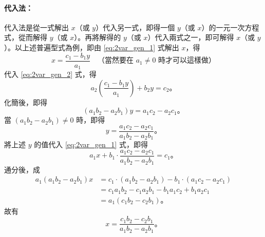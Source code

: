 \paragraph{代入法：}
代入法是從一式解出 $x$（或 $y$）代入另一式，即得一個 $y$（或 $x$）的一元一次方程式，從而解得 $y$（或 $x$）。再將解得的 $y$（或 $x$）代入兩式之一，即可解得 $x$（或 $y$）。以上述普遍型式為例，即由 \eqref{eq:2var_gen_1} 式解出 $x$，得
\begin{equation*}
  x = \frac{c_1 - b_1 y}{a_1} \quad \text{（當然要在 $a_1 \neq 0$ 時才可以這樣做）}
\end{equation*}
代入 \eqref{eq:2var_gen_2} 式，得
\begin{equation*}
  a_2 \left( \frac{c_1 - b_1 y}{a_1} \right) + b_2 y = c_2 \text{。}
\end{equation*}
化簡後，即得
\begin{equation*}
  (a_1 b_2 - a_2 b_1) y = a_1 c_2 - a_2 c_1 \text{。}
\end{equation*}
當 $(a_1 b_2 - a_2 b_1) \neq 0$ 時，即得
\begin{equation*}
  y = \frac{a_1 c_2 - a_2 c_1}{a_1 b_2 - a_2 b_1} \text{。}
\end{equation*}
將上述 $y$ 的值代入 \eqref{eq:2var_gen_1} 式，即得
\begin{equation*}
  a_1 x + b_1 \cdot \frac{a_1 c_2 - a_2 c_1}{a_1 b_2 - a_2 b_1} = c_1 \text{。}
\end{equation*}
通分後，成
\begin{align*}
  a_1 (a_1 b_2 - a_2 b_1) x &= c_1 \cdot (a_1 b_2 - a_2 b_1) - b_1 \cdot (a_1 c_2 - a_2 c_1) \\
  &= c_1 a_1 b_2 - c_1 a_2 b_1 - b_1 a_1 c_2 + b_1 a_2 c_1 \\
  &= a_1 (c_1 b_2 - c_2 b_1) \text{。}
\end{align*}
故有
\begin{equation*}
  x = \frac{c_1 b_2 - c_2 b_1}{a_1 b_2 - a_2 b_1} \text{。}
\end{equation*}

